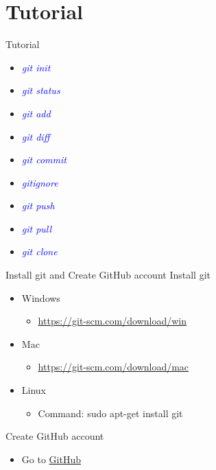 \documentclass[11pt]{beamer}
\begin{document}
\section{Tutorial}
\begin{frame}[fragile]{Tutorial}

\begin{itemize}
	\item \textcolor{blue}{\emph{git init}}
	\item \textcolor{blue}{\emph{git status}}
	\item \textcolor{blue}{\emph{git add}}
	\item \textcolor{blue}{\emph{git diff}}
	\item \textcolor{blue}{\emph{git commit}}
	\item \textcolor{blue}{\emph{gitignore}}
	\item \textcolor{blue}{\emph{git push}}
	\item \textcolor{blue}{\emph{git pull}}
	\item \textcolor{blue}{\emph{git clone}}
\end{itemize}
\end{frame}

\begin{frame}[fragile]{Install git and Create GitHub account}
Install git
\begin{itemize}
	\item Windows
	\begin{itemize}
		\item \href{https://git-scm.com/download/win}{https://git-scm.com/download/win}
	\end{itemize}
	\item Mac
	\begin{itemize}
		\item \href{https://git-scm.com/download/mac}{https://git-scm.com/download/mac}
	\end{itemize}
	
	\item Linux
	\begin{itemize}
		\item Command: sudo apt-get install git
	\end{itemize}	
\end{itemize}
Create GitHub account
\begin{itemize}
	\item Go to \href{https://github.com/}{GitHub}
\end{itemize}
\end{frame}
\end{document}
